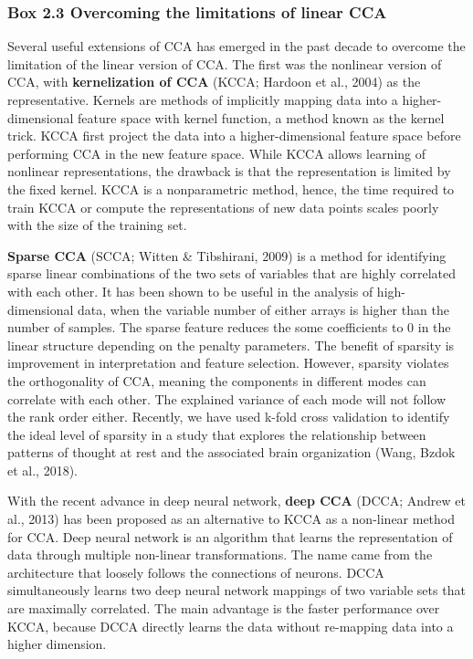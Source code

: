 \linespacesmall
\begin{shaded}
\footnotesize
\subsubsection*{Box 2.3 Overcoming the limitations of linear CCA}
\label{box:3}

\begin{minipage}[t]{1\textwidth}

\begin{multicols}{2}
Several useful extensions of CCA has emerged in the past decade to overcome the limitation of the linear version of CCA. The first was the nonlinear version of CCA, with \textbf{kernelization of CCA} (KCCA; Hardoon et al., 2004) as the representative.  Kernels are methods of implicitly mapping data into a higher-dimensional feature space with kernel function, a method known as the kernel trick. KCCA first project the data into a higher-dimensional feature space before performing CCA in the new feature space.  While KCCA allows learning of nonlinear representations, the drawback is that the representation is limited by the fixed kernel. KCCA is a nonparametric method, hence, the time required to train KCCA or compute the representations of new data points scales poorly with the size of the training set.

\textbf{Sparse CCA} (SCCA; Witten \& Tibshirani, 2009) is a method for identifying sparse linear combinations of the two sets of variables that are highly correlated with each other. It has been shown to be useful in the analysis of high-dimensional data, when the variable number of either arrays is higher than the number of samples. The sparse feature reduces the some coefficients to 0 in the linear structure depending on the penalty parameters. The benefit of sparsity is improvement in interpretation and feature selection. However, sparsity violates the orthogonality of CCA, meaning the components in different modes can correlate with each other. The explained variance of each mode will not follow the rank order either. Recently, we have used k-fold cross validation to identify the ideal level of sparsity in a study that explores the relationship between patterns of thought at rest and the associated brain organization (Wang, Bzdok et al., 2018).

With the recent advance in deep neural network, \textbf{deep CCA} (DCCA; Andrew et al., 2013) has been proposed as an alternative to KCCA as a non-linear method for CCA. Deep neural network is an algorithm that learns the representation of data through multiple non-linear transformations. The name came from the architecture that loosely follows the connections of neurons. DCCA simultaneously learns two deep neural network mappings of two variable sets that are maximally correlated. The main advantage is the faster performance over KCCA, because DCCA directly learns the data without re-mapping data into a higher dimension. 
\end{multicols}
\end{minipage}
\end{shaded}
\linespacenormal



